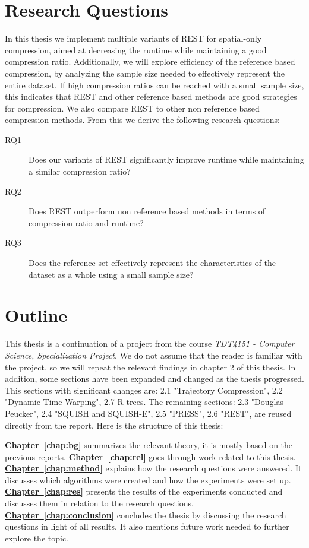 \section{Research Questions}
\label{sec:questions}
In this thesis we implement multiple variants of REST for spatial-only compression, aimed at decreasing the runtime while maintaining a good compression ratio. Additionally, we will explore efficiency of the reference based compression, by analyzing the sample size needed to effectively represent the entire dataset. If high compression ratios can be reached with a small sample size, this indicates that REST and other reference based methods are good strategies for compression. We also compare REST to other non reference based compression methods. From this we derive the following research questions:

\begin{description}
    \item[RQ1] Does our variants of REST significantly improve runtime while maintaining a similar compression ratio?
    \item[RQ2] Does REST outperform non reference based methods in terms of compression ratio and runtime?
    \item[RQ3] Does the reference set effectively represent the characteristics of the dataset as a whole using a small sample size?
\end{description}

\section{Outline}
This thesis is a continuation of a project from the course \textit{TDT4151 - Computer Science, Specialization Project}. We do not assume that the reader is familiar with the project, so we will repeat the relevant findings in chapter 2 of this thesis. In addition, some sections have been expanded and changed as the thesis progressed. This sections with significant changes are: 2.1 "Trajectory Compression", 2.2 "Dynamic Time Warping", 2.7 R-trees. The remaining sections: 2.3 "Douglas-Peucker", 2.4 "SQUISH and SQUISH-E", 2.5 "PRESS", 2.6 "REST", are reused directly from the report. Here is the structure of this thesis:

\textbf{\hyperref[chap:bg]{Chapter~\ref*{chap:bg}}} summarizes the relevant theory, it is mostly based on the previous reports.
\newline
\textbf{\hyperref[chap:rel]{Chapter~\ref*{chap:rel}}} goes through work related to this thesis.
\newline
\textbf{\hyperref[chap:method]{Chapter~\ref*{chap:method}}} explains how the research questions were answered. It discusses which algorithms were created and how the experiments were set up.
\newline
\textbf{\hyperref[chap:res]{Chapter~\ref*{chap:res}}} presents the results of the experiments conducted and discusses them in relation to the research questions.
\newline
\textbf{\hyperref[chap:conclusion]{Chapter~\ref*{chap:conclusion}}} concludes the thesis by discussing the research questions in light of all results. It also mentions future work needed to further explore the topic.



